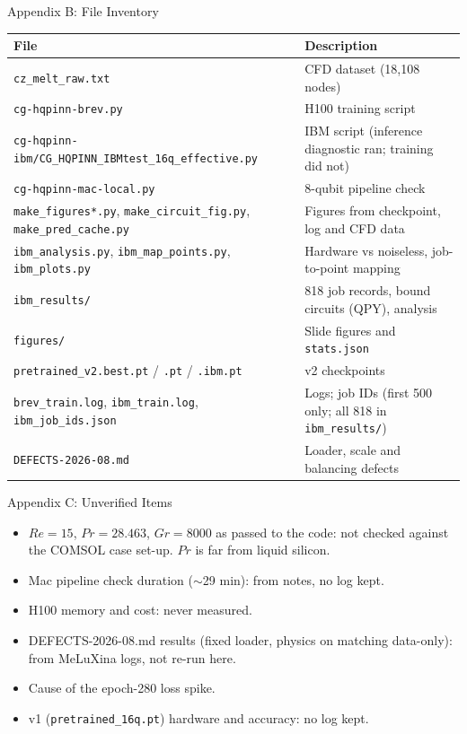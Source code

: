 \documentclass[aspectratio=169]{beamer}
\begin{document}
\begin{frame}{Appendix B: File Inventory}
\scriptsize
\begin{tabular}{ll}
\toprule
File & Description \\
\midrule
\texttt{cz\_melt\_raw.txt} & CFD dataset (18,108 nodes) \\
\texttt{cg-hqpinn-brev.py} & H100 training script \\
\texttt{cg-hqpinn-ibm/CG\_HQPINN\_IBMtest\_16q\_effective.py} & IBM script (inference diagnostic ran; training did not) \\
\texttt{cg-hqpinn-mac-local.py} & 8-qubit pipeline check \\
\texttt{make\_figures*.py}, \texttt{make\_circuit\_fig.py}, \texttt{make\_pred\_cache.py} & Figures from checkpoint, log and CFD data \\
\texttt{ibm\_analysis.py}, \texttt{ibm\_map\_points.py}, \texttt{ibm\_plots.py} & Hardware vs noiseless, job-to-point mapping \\
\texttt{ibm\_results/} & 818 job records, bound circuits (QPY), analysis \\
\texttt{figures/} & Slide figures and \texttt{stats.json} \\
\texttt{pretrained\_v2.best.pt} / \texttt{.pt} / \texttt{.ibm.pt} & v2 checkpoints \\
\texttt{brev\_train.log}, \texttt{ibm\_train.log}, \texttt{ibm\_job\_ids.json} & Logs; job IDs (first 500 only; all 818 in \texttt{ibm\_results/}) \\
\texttt{DEFECTS-2026-08.md} & Loader, scale and balancing defects \\
\bottomrule
\end{tabular}
\end{frame}

\begin{frame}{Appendix C: Unverified Items}
\begin{itemize}
  \item $Re=15$, $Pr=28.463$, $Gr=8000$ as passed to the code: not checked against the COMSOL case set-up. $Pr$ is far from liquid silicon.
  \item Mac pipeline check duration ($\sim$29 min): from notes, no log kept.
  \item H100 memory and cost: never measured.
  \item DEFECTS-2026-08.md results (fixed loader, physics on matching data-only): from MeLuXina logs, not re-run here.
  \item Cause of the epoch-280 loss spike.
  \item v1 (\texttt{pretrained\_16q.pt}) hardware and accuracy: no log kept.
\end{itemize}
\end{frame}
\end{document}
